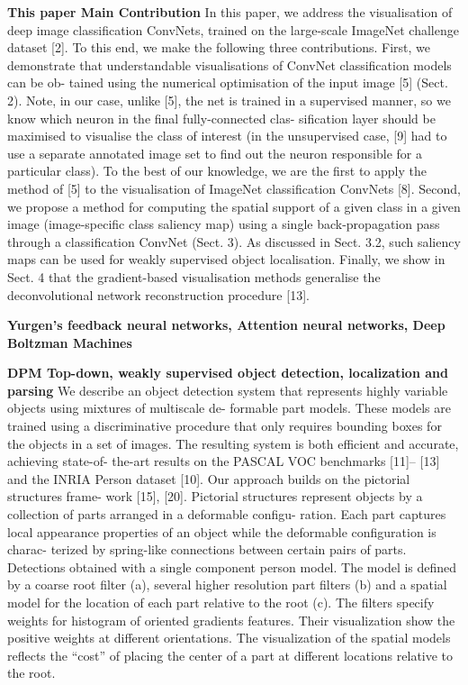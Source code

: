 \textbf{This paper Main Contribution}
In this paper, we address the visualisation of deep image classification ConvNets, trained on the large-scale ImageNet challenge dataset [2]. To this end, we make the following three contributions. First, we demonstrate that understandable visualisations of ConvNet classification models can be ob- tained using the numerical optimisation of the input image [5] (Sect. 2). Note, in our case, unlike [5], the net is trained in a supervised manner, so we know which neuron in the final fully-connected clas- sification layer should be maximised to visualise the class of interest (in the unsupervised case, [9] had to use a separate annotated image set to find out the neuron responsible for a particular class). To the best of our knowledge, we are the first to apply the method of [5] to the visualisation of ImageNet classification ConvNets [8]. Second, we propose a method for computing the spatial support of a given class in a given image (image-specific class saliency map) using a single back-propagation pass through a classification ConvNet (Sect. 3). As discussed in Sect. 3.2, such saliency maps can be used for weakly supervised object localisation. Finally, we show in Sect. 4 that the gradient-based visualisation methods generalise the deconvolutional network reconstruction procedure [13]. 

\textbf{Yurgen's feedback neural networks, Attention neural networks, Deep Boltzman Machines}

\textbf{DPM  Top-down, weakly supervised object detection, localization and parsing}
We describe an object detection system that represents highly variable objects using mixtures of multiscale de- formable part models. These models are trained using a discriminative procedure that only requires bounding boxes for the objects in a set of images. The resulting system is both efficient and accurate, achieving state-of- the-art results on the PASCAL VOC benchmarks [11]– [13] and the INRIA Person dataset [10]. 
Our approach builds on the pictorial structures frame- work [15], [20]. Pictorial structures represent objects by a collection of parts arranged in a deformable configu- ration. Each part captures local appearance properties of an object while the deformable configuration is charac- terized by spring-like connections between certain pairs of parts. 
Detections obtained with a single component person model. The model is defined by a coarse root filter (a), several higher resolution part filters (b) and a spatial model for the location of each part relative to the root (c). The filters specify weights for histogram of oriented gradients features. Their visualization show the positive weights at different orientations. The visualization of the spatial models reflects the “cost” of placing the center of a part at different locations relative to the root. 

